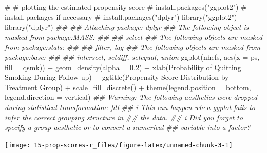 \documentclass[
  10pt,
  a4paper,
]{book}
\newenvironment{Shaded}{\begin{snugshade}}{\end{snugshade}}
\newcommand{\AttributeTok}[1]{\textcolor[rgb]{0.40,0.45,0.13}{#1}}
\newcommand{\CommentTok}[1]{\textcolor[rgb]{0.37,0.37,0.37}{#1}}
\newcommand{\DocumentationTok}[1]{\textcolor[rgb]{0.37,0.37,0.37}{\textit{#1}}}
\newcommand{\FloatTok}[1]{\textcolor[rgb]{0.68,0.00,0.00}{#1}}
\newcommand{\FunctionTok}[1]{\textcolor[rgb]{0.28,0.35,0.67}{#1}}
\newcommand{\NormalTok}[1]{\textcolor[rgb]{0.00,0.46,0.62}{#1}}
\newcommand{\SpecialCharTok}[1]{\textcolor[rgb]{0.37,0.37,0.37}{#1}}
\newcommand{\StringTok}[1]{\textcolor[rgb]{0.13,0.47,0.30}{#1}}
\begin{document}
\begin{Shaded}
\begin{Highlighting}[]
\CommentTok{\# \# plotting the estimated propensity score}
\CommentTok{\# install.packages("ggplot2") \# install packages if necessary}
\CommentTok{\# install.packages("dplyr")}
\FunctionTok{library}\NormalTok{(}\StringTok{"ggplot2"}\NormalTok{)}
\FunctionTok{library}\NormalTok{(}\StringTok{"dplyr"}\NormalTok{)}
\DocumentationTok{\#\# }
\DocumentationTok{\#\# Attaching package: \textquotesingle{}dplyr\textquotesingle{}}
\DocumentationTok{\#\# The following object is masked from \textquotesingle{}package:MASS\textquotesingle{}:}
\DocumentationTok{\#\# }
\DocumentationTok{\#\#     select}
\DocumentationTok{\#\# The following objects are masked from \textquotesingle{}package:stats\textquotesingle{}:}
\DocumentationTok{\#\# }
\DocumentationTok{\#\#     filter, lag}
\DocumentationTok{\#\# The following objects are masked from \textquotesingle{}package:base\textquotesingle{}:}
\DocumentationTok{\#\# }
\DocumentationTok{\#\#     intersect, setdiff, setequal, union}
\FunctionTok{ggplot}\NormalTok{(nhefs, }\FunctionTok{aes}\NormalTok{(}\AttributeTok{x =}\NormalTok{ ps, }\AttributeTok{fill =}\NormalTok{ qsmk)) }\SpecialCharTok{+} \FunctionTok{geom\_density}\NormalTok{(}\AttributeTok{alpha =} \FloatTok{0.2}\NormalTok{) }\SpecialCharTok{+}
  \FunctionTok{xlab}\NormalTok{(}\StringTok{\textquotesingle{}Probability of Quitting Smoking During Follow{-}up\textquotesingle{}}\NormalTok{) }\SpecialCharTok{+}
  \FunctionTok{ggtitle}\NormalTok{(}\StringTok{\textquotesingle{}Propensity Score Distribution by Treatment Group\textquotesingle{}}\NormalTok{) }\SpecialCharTok{+}
  \FunctionTok{scale\_fill\_discrete}\NormalTok{(}\StringTok{\textquotesingle{}\textquotesingle{}}\NormalTok{) }\SpecialCharTok{+}
  \FunctionTok{theme}\NormalTok{(}\AttributeTok{legend.position =} \StringTok{\textquotesingle{}bottom\textquotesingle{}}\NormalTok{, }\AttributeTok{legend.direction =} \StringTok{\textquotesingle{}vertical\textquotesingle{}}\NormalTok{)}
\DocumentationTok{\#\# Warning: The following aesthetics were dropped during statistical transformation: fill}
\DocumentationTok{\#\# i This can happen when ggplot fails to infer the correct grouping structure in}
\DocumentationTok{\#\#   the data.}
\DocumentationTok{\#\# i Did you forget to specify a \textasciigrave{}group\textasciigrave{} aesthetic or to convert a numerical}
\DocumentationTok{\#\#   variable into a factor?}
\end{Highlighting}
\end{Shaded}

\begin{center}\texttt{[image: 15-prop-scores-r\_files/figure-latex/unnamed-chunk-3-1]} \end{center}
\end{document}
